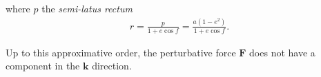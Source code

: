 where $p$ the \textit{semi-latus rectum}
\begin{align}
 r = \frac{p}{1+e\cos f} = \frac{a(1-e^2)}{1+e\cos f}.
\end{align}


Up to this approximative order, the perturbative force $\mathbf{F}$ does not have a component in the $\mathbf{k}$ direction. 

	
	





 




